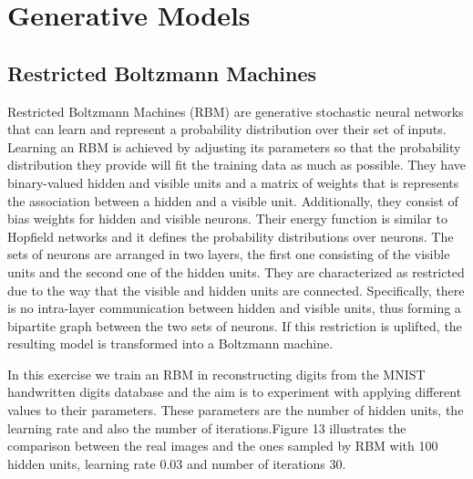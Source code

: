 \documentclass[11pt,conference,compsoc]{IEEEtran}
\begin{document}
\section{Generative Models}
\subsection{Restricted Boltzmann Machines}
Restricted Boltzmann Machines (RBM) are generative stochastic neural networks that can learn and represent a probability distribution over their set of inputs. Learning an RBM is achieved by adjusting its parameters so that the probability distribution they provide will fit the training data as much as possible. They have binary-valued hidden and visible units and a matrix of weights that is represents the association between a hidden and a visible unit. Additionally, they consist of bias weights for hidden and visible neurons. Their energy function is similar to Hopfield networks and it defines the probability distributions over neurons. The sets of neurons are arranged in two layers, the first one consisting of the visible units and the second one of the hidden units. They are characterized as restricted due to the way that the visible and hidden units are connected. Specifically, there is no intra-layer communication between hidden and visible units, thus forming a bipartite graph between the two sets of neurons. If this restriction is uplifted, the resulting model is transformed into a Boltzmann machine. 

In this exercise we train an RBM in reconstructing digits from the MNIST handwritten digits database and the aim is to experiment with applying different values to their parameters. These parameters are the number of hidden units, the learning rate and also the number of iterations.Figure 13 illustrates the comparison between the real images and the ones sampled by RBM with 100 hidden units, learning rate 0.03 and number of iterations 30.
\end{document}
